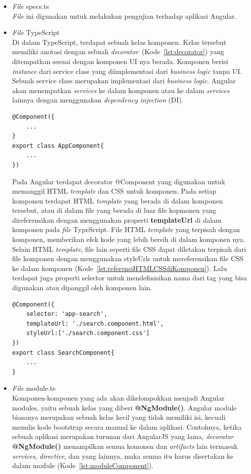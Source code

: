 \begin{itemize}
	\item \textit{File} specs.ts \\
		\textit{File} ini digunakan untuk melakukan pengujian terhadap aplikasi Angular. 
		
	\item \textit{File} TypeScript \\
		Di dalam TypeScript, terdapat sebuah kelas komponen. Kelas tersebut memiliki anotasi dengan sebuah \textit{decorator}~(Kode~\ref{lst:decorator}) yang ditempatkan sesuai dengan komponen UI nya berada. Komponen berisi \textit{instance} dari service class yang diimplementasi dari \textit{business logic} tanpa UI. Sebuah service class merupakan implementasi dari \textit{business logic}. Angular akan menempatkan \textit{services} ke dalam komponen atau ke dalam \textit{services} lainnya dengan menggunakan \textit{dependency injection} (DI). 	

\begin{lstlisting}[label={lst:decorator}, caption=Anotasi Komponen dengan \textit{Decorator}]
@Component({
	...
}
export class AppComponent{
	...
})
\end{lstlisting} 

		Pada Angular terdapat decorator @Component yang digunakan untuk memanggil HTML \textit{template} dan CSS untuk komponen. Pada setiap komponen terdapat HTML \textit{template} yang berada di dalam komponen tersebut, atau di dalam file yang berada di luar file kopmonen yang direferensikan dengan menggunakan properti \textbf{templateUrl} di dalam komponen pada \textit{file} TypeScript. File HTML \textit{template} yang terpisah dengan komponen, memberikan efek kode yang lebih bersih di dalam komponen nya. Selain HTML \textit{template}, file lain seperti file CSS dapat diletakan terpisah dari file komponen dengan menggunakan styleUrls untuk mereferensikan file CSS ke dalam komponen (Kode~\ref{lst:referensiHTMLCSSdiKomponen}). Lalu terdapat juga properti selector untuk mendefinisikan nama dari tag yang bisa digunakan atau dipanggil oleh komponen lain.

\begin{lstlisting}[label={lst:referensiHTMLCSSdiKomponen}, caption=Contoh Mereferensikan HTML dan CSS di Dalam Komponen]
@Component({
	selector: 'app-search',
	templateUrl: './search.component.html',
	styleUrl:['./search.component.css']
})
export class SearchComponent{
	...
}
\end{lstlisting} 

	\item \textit{File} module.ts \\
	Komponen-komponen yang ada akan dikelompokkan menjadi Angular modules, yaitu sebuah kelas yang diberi \textbf{@NgModule()}. Angular module biasanya merupakan sebuah kelas kecil yang tidak memiliki isi, kecuali menulis kode bootstrap secara manual ke dalam aplikasi. Contohnya, ketika sebuah aplikasi merupakan turunan dari AngularJS yang lama, \textit{decorator} \textbf{@NgModule()} menampilkan semua komonen dan \textit{artifacts} lain termasuk \textit{services}, \textit{directive}, dan yang lainnya, maka semua itu harus disertakan ke dalam module (Kode~\ref{lst:moduleComponent}). 


\end{itemize}
